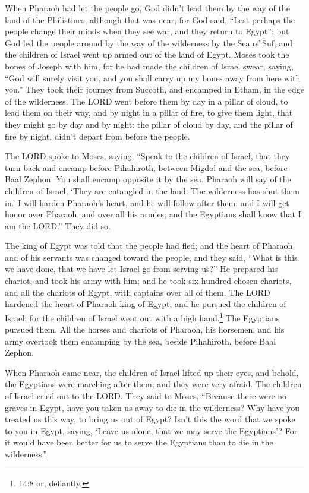 \myverse{}When Pharaoh had let the people go, God didn’t lead them by
the way of the land of the Philistines, although that was near; for God said, “Lest perhaps the people
change their minds when they see war, and they return to Egypt”;
\myverse{}but God led the people around by the way of the wilderness by the Sea of Suf;
and the children of Israel went up armed out of the land of Egypt.
\myverse{}Moses took the bones of Joseph with him, for he had made the children of
Israel swear, saying, “God will surely visit you, and you shall carry up my bones away from here with
you.”
\myverse{}They took their journey from Succoth, and encamped in Etham, in the edge
of the wilderness.
\myverse{}The LORD went before them by day in a pillar of cloud, to lead them on their
way, and by night in a pillar of fire, to give them light, that they might go by day and by night:
\myverse{}the pillar of cloud by day, and the pillar of fire by night, didn’t depart
from before the people.


\mychapter{} \myverse*{}The LORD spoke to Moses, saying,
\myverse{}“Speak to the children of Israel, that they turn back and encamp before Pihahiroth,
between Migdol and the sea, before Baal Zephon. You shall encamp opposite it by the sea.
\myverse{}Pharaoh will say of the children of Israel, ‘They are entangled in the land.
The wilderness has shut them in.’
\myverse{}I will harden Pharaoh’s heart, and he will follow after them; and I will get
honor over Pharaoh, and over all his armies; and the Egyptians shall know that I am the LORD.” They did
so.


\myverse{}The king of Egypt was told that the people had fled; and the heart
of Pharaoh and of his servants was changed toward the people, and they said, “What is this we have done,
that we have let Israel go from serving us?”
\myverse{}He prepared his chariot, and took his army with him;
\myverse{}and he took six hundred chosen chariots, and all the chariots of Egypt, with
captains over all of them.
\myverse{}The LORD hardened the heart of Pharaoh king of Egypt, and he pursued the children
of Israel; for the children of Israel went out with a high hand.\footnote{14:8 or, defiantly.}
\myverse{}The Egyptians pursued them. All the horses and chariots of Pharaoh, his horsemen,
and his army overtook them encamping by the sea, beside Pihahiroth, before Baal Zephon.


\myverse{}When Pharaoh came near, the children of Israel lifted up their
eyes, and behold, the Egyptians were marching after them; and they were very afraid. The children of Israel
cried out to the LORD.
\myverse{}They said to Moses, “Because there were no graves in Egypt, have you taken
us away to die in the wilderness? Why have you treated us this way, to bring us out of Egypt?
\myverse{}Isn’t this the word that we spoke to you in Egypt, saying, ‘Leave us alone,
that we may serve the Egyptians’? For it would have been better for us to serve the Egyptians than to
die in the wilderness.”


